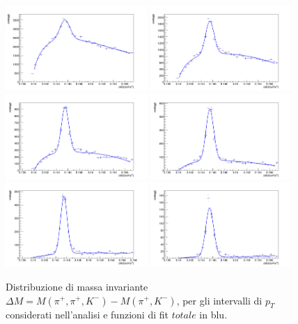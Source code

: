 \begin{figure}[h]      \centering
       \includegraphics[width=0.48\textwidth]{AnalisiDati/pt_2_3_pol2.png}
        \includegraphics[width=0.48\textwidth]{AnalisiDati/pt_3_4_pol2.png}
        \includegraphics[width=0.48\textwidth]{AnalisiDati/pt_4_5_pol2.png}
        \includegraphics[width=0.48\textwidth]{AnalisiDati/pt_5_6_pol2.png}\\
        \includegraphics[width=0.48\textwidth]{AnalisiDati/pt_6_8_pol2.png}
        \includegraphics[width=0.48\textwidth]{AnalisiDati/pt_8_12_pol2.png}\\
       \caption{Distribuzione di massa invariante $\Delta M = M(\pi^+,\pi^+,K^-) - M(\pi^+,K^-)$, per gli intervalli di $p_T$ considerati nell'analisi e funzioni di fit $totale$ in blu.}
       \label{fig:fit}
   \end{figure}


